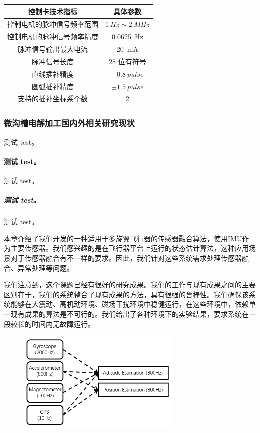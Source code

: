 \documentclass[
  type=master
]{gdutthesis}
\begin{document}
\begin{table}
  \label{tab:example}
  \begin{tabular}{cc}
    \toprule
    控制卡技术指标              & 具体参数                      \\
    \midrule
    控制电机的脉冲信号频率范围  & $\SI{1}{Hz}\sim\SI{2}{MHz}$ \\
    控制电机的脉冲信号频率精度  & \SI{0.0625}{Hz}              \\
    脉冲信号输出最大电流        & \SI{20}{mA}                  \\
    脉冲信号长度                & 28 位有符号                   \\
    直线插补精度                & $\pm \SI{0.8}{pulse}$        \\
    圆弧插补精度                & $\pm \SI{1.5}{pulse}$        \\
    支持的插补坐标系个数        & 2                             \\
    \bottomrule
  \end{tabular}
\end{table}


\subsubsection{微沟槽电解加工国内外相关研究现状}
测试 test。
\paragraph{测试 test。}
测试 test。
\subparagraph{测试 test。}
测试 test\cite{woerdelun2012jingji}。

本章介绍了我们开发的一种适用于多旋翼飞行器的传感器融合算法，使用IMU作为主要传感器。我们感兴趣的是在飞行器平台上运行的状态估计算法，这种应用场景对于传感器融合有不一样的要求。因此，我们针对这些系统需求处理传感器融合、异常处理等问题。

我们注意到，这个课题已经有很好的研究成果\cite{mahony2008nonlinear,hua2010attitude,khosravian2016state}。我们的工作与现有成果之间的主要区别在于，我们的系统整合了现有成果的方法，具有很强的鲁棒性。我们确保该系统能够在大震动、高机动环境、磁场干扰环境中稳健运行，在这些环境中，依赖单一现有成果的算法是不可行的。我们给出了各种环境下的实验结果，要求系统在一段较长的时间内无故障运行。
\begin{figure}[htbp]
	\centering
	\includegraphics[width=0.7\textwidth]{state estimation.png}
	\label{fig:stateestimation}
\end{figure} 
\end{document}
